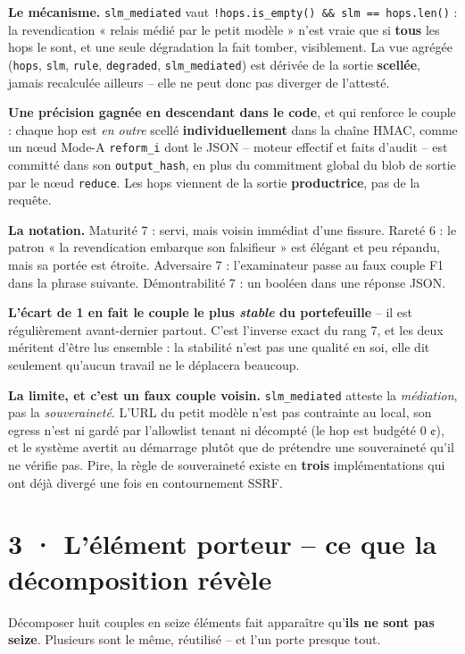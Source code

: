 \documentclass[10pt]{article}
\newcommand{\sz}[1]{{\small\color{grey}\textsf{#1}}}
\newcommand{\code}[1]{\texttt{\small #1}}
\begin{document}
\textbf{Le mécanisme.} \code{slm\_mediated} vaut \code{!hops.is\_empty() \&\& slm == hops.len()} : la
revendication « relais médié par le petit modèle » n'est vraie que si \textbf{tous} les hops le sont,
et une seule dégradation la fait tomber, visiblement. La vue agrégée
\sz{(\code{hops}, \code{slm}, \code{rule}, \code{degraded}, \code{slm\_mediated})} est dérivée de la
sortie \textbf{scellée}, jamais recalculée ailleurs -- elle ne peut donc pas diverger de l'attesté.

\textbf{Une précision gagnée en descendant dans le code}, et qui renforce le couple : chaque hop est
\emph{en outre} scellé \textbf{individuellement} dans la chaîne HMAC, comme un n\oe ud Mode-A
\code{reform\_i} dont le JSON -- moteur effectif et faits d'audit -- est committé dans son
\code{output\_hash}, en plus du commitment global du blob de sortie par le n\oe ud \code{reduce}. Les
hops viennent de la sortie \textbf{productrice}, pas de la requête.

\textbf{La notation.} \sz{Maturité 7} : servi, mais voisin immédiat d'une fissure. \sz{Rareté 6} : le
patron « la revendication embarque son falsifieur » est élégant et peu répandu, mais sa portée est
étroite. \sz{Adversaire 7} : l'examinateur passe au faux couple F1 dans la phrase suivante.
\sz{Démontrabilité 7} : un booléen dans une réponse JSON.

\textbf{L'écart de 1 en fait le couple le plus \emph{stable} du portefeuille} -- il est régulièrement
avant-dernier partout. C'est l'inverse exact du rang 7, et les deux méritent d'être lus ensemble : la
stabilité n'est pas une qualité en soi, elle dit seulement qu'aucun travail ne le déplacera beaucoup.

\textbf{La limite, et c'est un faux couple voisin.} \code{slm\_mediated} atteste la \emph{médiation},
pas la \emph{souveraineté}. L'URL du petit modèle n'est pas contrainte au local, son egress n'est ni
gardé par l'allowlist tenant ni décompté \sz{(le hop est budgété 0 ¢)}, et le système avertit au
démarrage plutôt que de prétendre une souveraineté qu'il ne vérifie pas. Pire, la règle de
souveraineté existe en \textbf{trois} implémentations qui ont déjà divergé une fois en contournement
SSRF.

\section{3 · L'élément porteur -- ce que la décomposition révèle}

Décomposer huit couples en seize éléments fait apparaître qu'\textbf{ils ne sont pas seize}. Plusieurs
sont le même, réutilisé -- et l'un porte presque tout.
\end{document}
